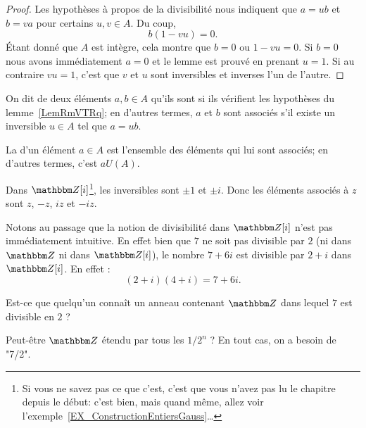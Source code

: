 \begin{proof}
    Les hypothèses à propos de la divisibilité nous indiquent que \( a=ub\) et \( b=va\) pour certains \( u,v\in A\). Du coup,
    \begin{equation}
        b(1-vu)=0.
    \end{equation}
    Étant donné que \( A\) est intègre, cela montre que \( b=0\) ou \( 1-vu=0\). Si \( b=0\) nous avons immédiatement \( a=0\) et le lemme est prouvé en prenant \( u = 1 \). Si au contraire \( vu=1\), c'est que \( v\) et \( u\) sont inversibles et inverses l'un de l'autre.
\end{proof}

\begin{definition}\label{DefrXUixs}
    On dit de deux éléments \( a,b\in A\) qu'ils sont  si ils vérifient les hypothèses du lemme~\ref{LemRmVTRq}; en d'autres termes, $a$ et $b$ sont associés s'il existe un inversible \( u\in A\) tel que \( a=ub\).

    La  d'un élément \( a \in A \) est l'ensemble des éléments qui lui sont associés; en d'autres termes, c'est \( a  U(A) \).
\end{definition}

\begin{example}
    Dans \( \eZ[i]\)\footnote{Si vous ne savez pas ce que c'est, c'est que vous n'avez pas lu le chapitre depuis le début: c'est bien, mais quand même, allez voir l'exemple~\ref{EX_ConstructionEntiersGauss}\dots}, les inversibles sont \( \pm 1\) et \( \pm i\). Donc les éléments associés à \( z\) sont \( z\), \( -z\), \( iz\) et \( -iz\).

    Notons au passage que la notion de divisibilité dans \( \eZ[i]\) n'est pas immédiatement intuitive. En effet bien que \( 7\) ne soit pas divisible par \( 2\) (ni dans \( \eZ\) ni dans \( \eZ[i]\)), le nombre \( 7+6i\) est divisible par \( 2+i\) dans \( \eZ[i]\). En effet :
    \begin{equation}
        (2+i)(4+i)=7+6i.
    \end{equation}
\end{example}

\begin{probleme}
    Est-ce que quelqu'un connaît un anneau contenant \( \eZ\) dans lequel \( 7\) est divisible en \( 2\) ?

    Peut-être \( \eZ\) étendu par tous les \( 1/2^n\) ? En tout cas, on a besoin de "7/2".
\end{probleme}

